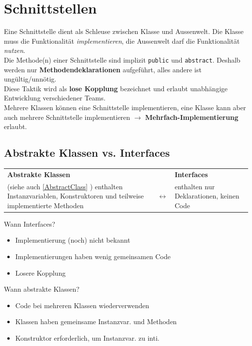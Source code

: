 \section{Schnittstellen}
Eine Schnittstelle dient als Schleuse zwischen Klasse und Aussenwelt. Die Klasse muss die Funktionalität \textit{implementieren},
die Aussenwelt darf die Funktionalität \textit{nutzen}.\\
Die Methode(n) einer Schnittstelle sind implizit \verb|public| und \verb|abstract|. Deshalb werden nur \textbf{Methodendeklarationen} aufgeführt,
alles andere ist ungültig/unnötig.\\

Diese Taktik wird als \textbf{lose Kopplung} bezeichnet und erlaubt unabhängige Entwicklung verschiedener Teams.\\

Mehrere Klassen können eine Schnittstelle implementieren, eine Klasse kann aber auch mehrere Schnittstelle implementieren $\rightarrow$
\textbf{Mehrfach-Implementierung} erlaubt.

\subsection{Abstrakte Klassen vs. Interfaces}
\begin{tabularx}{\linewidth}{|X c X|} \hline
    \textbf{Abstrakte Klassen} & & \textbf{Interfaces} \\
    (siehe auch \ref{AbstractClass} ) enthalten Instanzvariablen, Konstruktoren und teilweise implementierte Methoden & $\longleftrightarrow $ & enthalten nur Deklarationen, keinen Code \\
    \hline
\end{tabularx}

Wann Interfaces?
\begin{itemize}
    \itemsep0em
    \item Implementierung (noch) nicht bekannt
    \item Implementierungen haben wenig gemeinsamen Code
    \item Losere Kopplung
\end{itemize}

Wann abstrakte Klassen?
\begin{itemize}
    \itemsep0em
    \item Code bei mehreren Klassen wiederverwenden
    \item Klassen haben gemeinsame Instanzvar. und Methoden
    \item Konstruktor erforderlich, um Instanzvar. zu inti.
\end{itemize}

